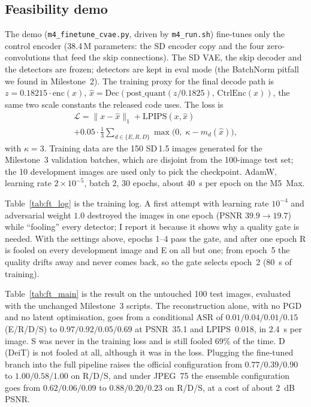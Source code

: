 \documentclass[journal]{IEEEtran}
\begin{document}
\subsection{Feasibility demo}
\label{sec:enhance-demo}

The demo (\texttt{m4\_finetune\_cvae.py}, driven by \texttt{m4\_run.sh}) fine-tunes only the control encoder (38.4\,M parameters: the SD encoder copy and the four zero-convolutions that feed the skip connections). The SD VAE, the skip decoder and the detectors are frozen; detectors are kept in eval mode (the BatchNorm pitfall we found in Milestone~2). The training proxy for the final decode path is $z = 0.18215\cdot\mathrm{enc}(x)$, $\hat{x} = \mathrm{Dec}(\mathrm{post\_quant}(z/0.1825),\,\mathrm{CtrlEnc}(x))$, the same two scale constants the released code uses. The loss is
\begin{multline*}
\mathcal{L} = \|x-\hat{x}\|_1 + \mathrm{LPIPS}(x,\hat{x}) \\
 + 0.05\cdot\tfrac{1}{3}\sum_{d\in\{E,R,D\}} \max\!\big(0,\;\kappa - m_d(\hat{x})\big),
\end{multline*}
with $\kappa=3$. Training data are the 150 SD\,1.5 images generated for the Milestone~3 validation batches, which are disjoint from the 100-image test set; the 10 development images are used only to pick the checkpoint. AdamW, learning rate $2\times10^{-5}$, batch 2, 30 epochs, about 40~s per epoch on the M5~Max.

Table~\ref{tab:ft_log} is the training log. A first attempt with learning rate $10^{-4}$ and adversarial weight $1.0$ destroyed the images in one epoch (PSNR $39.9\rightarrow19.7$) while ``fooling'' every detector; I report it because it shows why a quality gate is needed. With the settings above, epochs 1--4 pass the gate, and after one epoch R is fooled on every development image and E on all but one; from epoch~5 the quality drifts away and never comes back, so the gate selects epoch~2 (80~s of training).

Table~\ref{tab:ft_main} is the result on the untouched 100 test images, evaluated with the unchanged Milestone~3 scripts. The reconstruction alone, with no PGD and no latent optimisation, goes from a conditional ASR of $0.01/0.04/0.01/0.15$ (E/R/D/S) to $0.97/0.92/0.05/0.69$ at PSNR~35.1 and LPIPS~0.018, in 2.4~s per image. S was never in the training loss and is still fooled 69\% of the time. D (DeiT) is not fooled at all, although it was in the loss. Plugging the fine-tuned branch into the full pipeline raises the official configuration from $0.77/0.39/0.90$ to $1.00/0.58/1.00$ on R/D/S, and under JPEG~75 the ensemble configuration goes from $0.62/0.06/0.09$ to $0.88/0.20/0.23$ on R/D/S, at a cost of about 2~dB PSNR.
\end{document}
